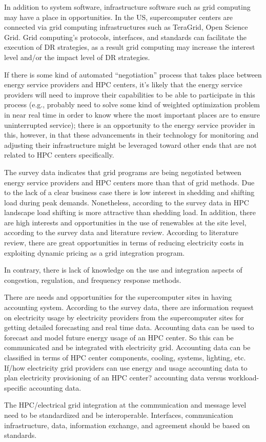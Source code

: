 In addition to system software, infrastructure software such as grid
computing may have a place in opportunities.  In the US, supercomputer
centers are connected via grid computing infrastructures such as
TeraGrid, Open Science Grid.  Grid computing's protocols, interfaces,
and standards can facilitate the execution of DR strategies, as a
result grid computing may increase the interest level and/or the
impact level of DR strategies.

If there is some kind of automated ``negotiation'' process that takes
place between energy service providers and HPC centers, it's likely that the
energy service providers will need to improve their capabilities to be able
to participate in this process (e.g., probably need to solve some kind
of weighted optimization problem in near real time in order to know
where the most important places are to ensure uninterrupted service);
there is an opportunity to the energy service provider in this, however, in
that these advancements in their technology for monitoring and
adjusting their infrastructure might be leveraged toward other ends
that are not related to HPC centers specifically.


The survey data indicates that grid programs are being negotiated
between energy service providers and HPC centers more than that of grid
methods.  Due to the lack of a clear business case there is low
interest in shedding and shifting load during peak
demands.  Nonetheless, according to the survey data in HPC landscape
load shifting is more attractive than shedding load.  In addition,
there are high interests and opportunities in the use of renewables at
the site level, according to the survey data and literature
review.  According to literature review, there are great opportunities
in terms of reducing electricity costs in exploiting dynamic pricing
as a grid integration program.

In contrary, there is lack of knowledge on the use and integration
aspects of congestion, regulation, and frequency response methods.

There are needs and opportunities for the supercomputer sites in
having accounting system.  According to the survey data, there are
information request on electricity usage by electricity providers from
the supercomputer sites for getting detailed forecasting and real time
data.  Accounting data can be used to forecast and model future energy
usage of an HPC center.  So this can be communicated and be integrated
with electricity grid.  Accounting data can be classified in terms of
HPC center components, cooling, systems, lighting, etc.  If/how
electricity grid providers can use energy and usage accounting data to
plan electricity provisioning of an HPC center? %
accounting data versus workload-specific accounting data.


The HPC/electrical grid integration at the communication and message
level need to be standardized and be interoperable.  Interfaces,
communication infrastructure, data, information exchange, and
agreement should be based on standards.
